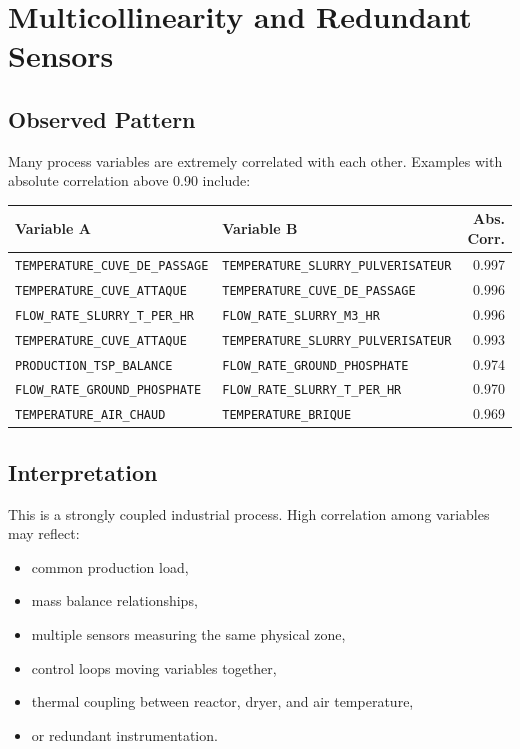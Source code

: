 \documentclass[11pt,a4paper]{article}
\begin{document}
\section{Multicollinearity and Redundant Sensors}

\subsection{Observed Pattern}

Many process variables are extremely correlated with each other. Examples with absolute correlation above 0.90 include:

\begin{longtable}{p{7cm}p{7cm}r}
\toprule
Variable A & Variable B & Abs. Corr. \\
\midrule
\texttt{TEMPERATURE\_CUVE\_DE\_PASSAGE} & \texttt{TEMPERATURE\_SLURRY\_PULVERISATEUR} & 0.997 \\
\texttt{TEMPERATURE\_CUVE\_ATTAQUE} & \texttt{TEMPERATURE\_CUVE\_DE\_PASSAGE} & 0.996 \\
\texttt{FLOW\_RATE\_SLURRY\_T\_PER\_HR} & \texttt{FLOW\_RATE\_SLURRY\_M3\_HR} & 0.996 \\
\texttt{TEMPERATURE\_CUVE\_ATTAQUE} & \texttt{TEMPERATURE\_SLURRY\_PULVERISATEUR} & 0.993 \\
\texttt{PRODUCTION\_TSP\_BALANCE} & \texttt{FLOW\_RATE\_GROUND\_PHOSPHATE} & 0.974 \\
\texttt{FLOW\_RATE\_GROUND\_PHOSPHATE} & \texttt{FLOW\_RATE\_SLURRY\_T\_PER\_HR} & 0.970 \\
\texttt{TEMPERATURE\_AIR\_CHAUD} & \texttt{TEMPERATURE\_BRIQUE} & 0.969 \\
\bottomrule
\end{longtable}

\subsection{Interpretation}

This is a strongly coupled industrial process. High correlation among variables may reflect:

\begin{itemize}
    \item common production load,
    \item mass balance relationships,
    \item multiple sensors measuring the same physical zone,
    \item control loops moving variables together,
    \item thermal coupling between reactor, dryer, and air temperature,
    \item or redundant instrumentation.
\end{itemize}
\end{document}
